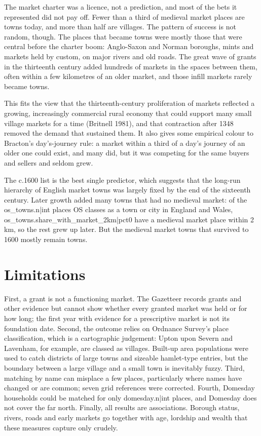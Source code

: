 \documentclass[11pt,a4paper]{article}
\begin{document}
The market charter was a licence, not a prediction, and most of the bets it represented did not pay off. Fewer than a third of medieval market places are towns today, and more than half are villages. The pattern of success is not random, though. The places that became towns were mostly those that were central before the charter boom: Anglo-Saxon and Norman boroughs, mints and markets held by custom, on major rivers and old roads. The great wave of grants in the thirteenth century added hundreds of markets in the spaces between them, often within a few kilometres of an older market, and those infill markets rarely became towns.

This fits the view that the thirteenth-century proliferation of markets reflected a growing, increasingly commercial rural economy that could support many small village markets for a time (Britnell 1981), and that contraction after 1348 removed the demand that sustained them. It also gives some empirical colour to Bracton's day's-journey rule: a market within a third of a day's journey of an older one could exist, and many did, but it was competing for the same buyers and sellers and seldom grew.

The c.1600 list is the best single predictor, which suggests that the long-run hierarchy of English market towns was largely fixed by the end of the sixteenth century. Later growth added many towns that had no medieval market: of the {{os_towns.n|int}} places OS classes as a town or city in England and Wales, {{os_towns.share_with_market_2km|pct0}} have a medieval market place within 2 km, so the rest grew up later. But the medieval market towns that survived to 1600 mostly remain towns.

\section{Limitations}

First, a grant is not a functioning market. The Gazetteer records grants and other evidence but cannot show whether every granted market was held or for how long; the first year with evidence for a prescriptive market is not its foundation date. Second, the outcome relies on Ordnance Survey's place classification, which is a cartographic judgement: Upton upon Severn and Lavenham, for example, are classed as villages. Built-up area populations were used to catch districts of large towns and sizeable hamlet-type entries, but the boundary between a large village and a small town is inevitably fuzzy. Third, matching by name can misplace a few places, particularly where names have changed or are common; seven grid references were corrected. Fourth, Domesday households could be matched for only {{domesday.n|int}} places, and Domesday does not cover the far north. Finally, all results are associations. Borough status, rivers, roads and early markets go together with age, lordship and wealth that these measures capture only crudely.
\end{document}
